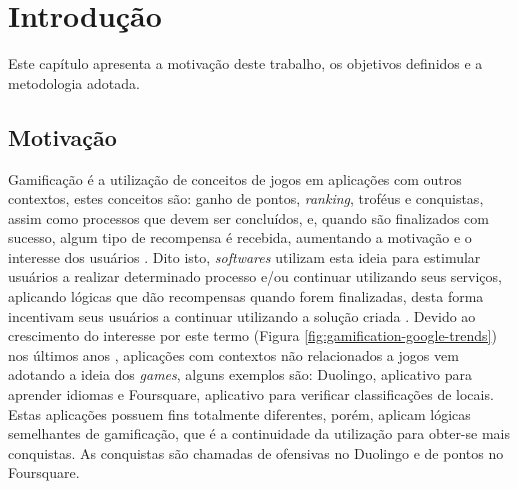 \chapter[Introdução]{Introdução}
\par Este capítulo apresenta a motivação deste trabalho, os objetivos definidos e a metodologia adotada.

\section{Motivação}

\par Gamificação é a utilização de conceitos de jogos em aplicações com outros contextos, estes conceitos são: ganho de pontos, \textit{ranking}, troféus e conquistas, assim como processos que devem ser concluídos, e, quando são finalizados com sucesso, algum tipo de recompensa é recebida, aumentando a motivação e o interesse dos usuários \cite{robson2015all}. Dito isto, \textit{softwares} utilizam esta ideia para estimular usuários a realizar determinado processo e/ou continuar utilizando seus serviços, aplicando lógicas que dão recompensas quando forem finalizadas, desta forma incentivam seus usuários a continuar utilizando a solução criada \cite{hamari2014does}. Devido ao crescimento do interesse por este termo (Figura \ref{fig:gamification-google-trends}) nos últimos anos \cite{groh2012gamification}, aplicações com contextos não relacionados a jogos vem adotando a ideia dos \textit{games}, alguns exemplos são: Duolingo, aplicativo para aprender idiomas e Foursquare, aplicativo para verificar classificações de locais. Estas aplicações possuem fins totalmente diferentes, porém, aplicam lógicas semelhantes de gamificação, que é a continuidade da utilização para obter-se mais conquistas. As conquistas são chamadas de ofensivas no Duolingo e de pontos no Foursquare.

